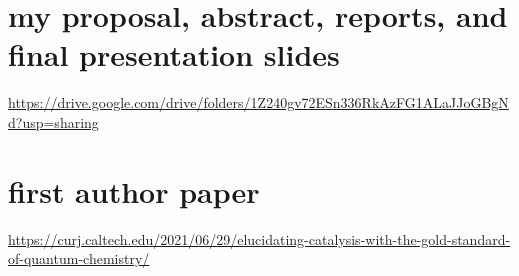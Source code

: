 \documentclass{article}
\begin{document}
\section{my proposal, abstract, reports, and final presentation slides}
\url{https://drive.google.com/drive/folders/1Z240gv72ESn336RkAzFG1ALaJJoGBgNd?usp=sharing}
\section{first author paper}
\url{https://curj.caltech.edu/2021/06/29/elucidating-catalysis-with-the-gold-standard-of-quantum-chemistry/}
\end{document}
